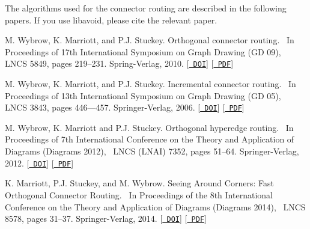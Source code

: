 The algorithms used for the connector routing are described in the following papers. If you use libavoid, please cite the relevant paper.
\begin{DoxyItemize}
\item M. Wybrow, K. Marriott, and P.\+J. Stuckey. Orthogonal connector routing.~\newline
 In Proceedings of 17th International Symposium on Graph Drawing (GD \textquotesingle{}09),~\newline
 LNCS 5849, pages 219–231. Spring-\/\+Verlag, 2010. \mbox{[}\href{http://dx.doi.org/10.1007/978-3-642-11805-0_22}{\texttt{ DOI}}\mbox{]} \mbox{[}\href{http://users.monash.edu/~mwybrow/papers/wybrow-gd-2009.pdf}{\texttt{ PDF}}\mbox{]}
\item M. Wybrow, K. Marriott, and P.\+J. Stuckey. Incremental connector routing.~\newline
 In Proceedings of 13th International Symposium on Graph Drawing (GD \textquotesingle{}05),~\newline
 LNCS 3843, pages 446—457. Springer-\/\+Verlag, 2006. \mbox{[}\href{http://dx.doi.org/10.1007/11618058_40}{\texttt{ DOI}}\mbox{]} \mbox{[}\href{http://users.monash.edu/~mwybrow/papers/wybrow-gd-2005.pdf}{\texttt{ PDF}}\mbox{]}
\item M. Wybrow, K. Marriott and P.\+J. Stuckey. Orthogonal hyperedge routing.~\newline
 In Proceedings of 7th International Conference on the Theory and Application of Diagrams (Diagrams 2012),~\newline
 LNCS (LNAI) 7352, pages 51--64. Springer-\/\+Verlag, 2012. \mbox{[}\href{http://dx.doi.org/10.1007/978-3-642-31223-6_10}{\texttt{ DOI}}\mbox{]} \mbox{[}\href{http://users.monash.edu/~mwybrow/papers/wybrow-diagrams-2012.pdf}{\texttt{ PDF}}\mbox{]}
\item K. Marriott, P.\+J. Stuckey, and M. Wybrow. Seeing Around Corners\+: Fast Orthogonal Connector Routing.~\newline
 In Proceedings of the 8th International Conference on the Theory and Application of Diagrams (Diagrams 2014),~\newline
 LNCS 8578, pages 31--37. Springer-\/\+Verlag, 2014. \mbox{[}\href{http://doi.acm.org/10.1007/978-3-662-44043-8_4}{\texttt{ DOI}}\mbox{]} \mbox{[}\href{http://users.monash.edu/~mwybrow/papers/marriott-diagrams-2014.pdf}{\texttt{ PDF}}\mbox{]}
\end{DoxyItemize}

